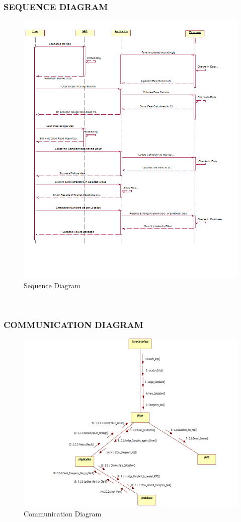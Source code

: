 \documentclass[12pt,a4paper]{article}
\begin{document}
\subsubsection{SEQUENCE DIAGRAM}
\begin{figure}[!htb]
\centering
\includegraphics[width=15 cm]{Seq}
\caption{Sequence Diagram}
\end{figure}
\\
\newpage
\subsubsection{COMMUNICATION DIAGRAM}
\begin{figure}[!htb]
\centering
\includegraphics[width=15 cm]{communication}
\caption{Communication Diagram}
\end{figure}
\\
\newpage
\end{document}
